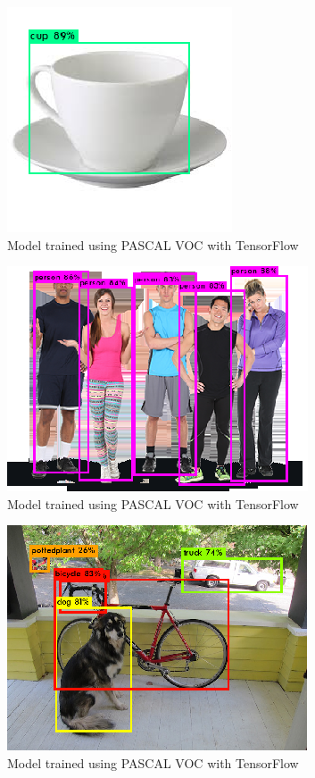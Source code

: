 \begin{figure}[h]
\centering
\includegraphics[scale=0.8]{figures/prediction_3.png}
\caption{Model trained  using PASCAL VOC with TensorFlow}
\label{prediction(3)}
\end{figure}


\begin{figure}[h]
\centering
\includegraphics[scale=0.8]{figures/prediction_4.png}
\caption{Model trained  using PASCAL VOC with TensorFlow}
\label{prediction(4)}
\end{figure}

\begin{figure}[h]
\centering
\includegraphics[scale=0.8]{figures/prediction_5.png}
\caption{Model trained  using PASCAL VOC with TensorFlow}
\label{prediction(5)}
\end{figure}
